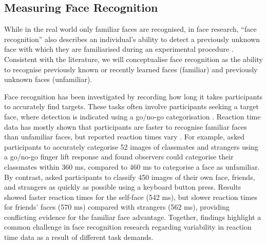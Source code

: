 \documentclass[
  10pt,
  letterpaper,
]{article}
\begin{document}
\subsection{Measuring Face
Recognition}\label{measuring-face-recognition}

While in the real world only familiar faces are recognised, in face
research, ``face recognition'' also describes an individual's ability to
detect a previously unknown face with which they are familiarised during
an experimental procedure
\citep{burton2013a, hancock2000a, white_individual_2022}. Consistent
with the literature, we will conceptualise face recognition as the
ability to recognise previously known or recently learned faces
(familiar) and previously unknown faces (unfamiliar).

Face recognition has been investigated by recording how long it takes
participants to accurately find targets. These tasks often involve
participants seeking a target face, where detection is indicated using a
go/no-go categorisation \citep{kloth2006a, ramon2011a, tong1999a}.
Reaction time data has mostly shown that participants are faster to
recognise familiar faces than unfamiliar faces, but reported reaction
times vary \citep{burton2015a, ramon2011a, ramon2017a}. For example,
\citet{ramon2011a} asked participants to accurately categorise 52 images
of classmates and strangers using a go/no-go finger lift response and
found observers could categorise their classmates within 360 ms,
compared to 460 ms to categorise a face as unfamiliar. By contrast,
\citet{alzueta2019a} asked participants to classify 450 images of their
own face, friends, and strangers as quickly as possible using a keyboard
button press. Results showed faster reaction times for the self-face
(542 ms), but slower reaction times for friends' faces (570 ms) compared
with strangers (562 ms), providing conflicting evidence for the familiar
face advantage. Together, findings highlight a common challenge in face
recognition research regarding variability in reaction time data as a
result of different task demands.
\end{document}
